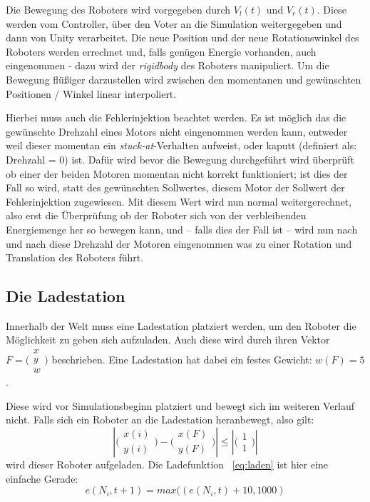 Die Bewegung des Roboters wird vorgegeben durch $V_l(t)$ und $ V_r(t)$. Diese werden vom Controller, {\"{u}}ber den Voter an die Simulation
weitergegeben und dann von Unity verarbeitet. Die neue Position und der neue Rotationswinkel des Roboters werden errechnet und,
falls gen{\"{u}}gen Energie vorhanden, auch eingenommen - dazu wird der \textit{rigidbody} des Roboters manipuliert.
Um die Bewegung fl{\"{u}}{\ss}iger darzustellen wird zwischen den momentanen und gew{\"{u}}nschten Positionen / Winkel linear interpoliert.

Hierbei muss auch die Fehlerinjektion beachtet werden. Es ist m{\"{o}}glich das die gew{\"{u}}nschte Drehzahl eines Motors nicht eingenommen werden
kann, entweder weil dieser momentan ein \textit{stuck-at}-Verhalten aufweist, oder kaputt (definiert als: Drehzahl = 0) ist. Daf{\"{u}}r wird bevor
die Bewegung durchgef{\"{u}}hrt wird {\"{u}}berpr{\"{u}}ft ob einer der beiden Motoren momentan nicht korrekt funktioniert; ist dies der Fall so wird,
statt des gew{\"{u}}nschten Sollwertes, diesem Motor der Sollwert der Fehlerinjektion zugewiesen. Mit diesem Wert wird nun normal weitergerechnet, also
erst die {\"{U}}berpr{\"{u}}fung ob der Roboter sich von der verbleibenden Energiemenge her so bewegen kann, und -- falls dies der Fall ist -- wird nun
nach und nach diese Drehzahl der Motoren eingenommen was zu einer Rotation und Translation des Roboters f{\"{u}}hrt.

\subsection{Die Ladestation}\label{fuelstation}
Innerhalb der Welt muss eine Ladestation platziert werden, um den Roboter die M{\"{o}}glichkeit zu geben sich aufzuladen. Auch diese wird durch ihren Vektor $ F = \bigl(\begin{smallmatrix} x \\ y \\ w \end{smallmatrix}\bigr)$ beschrieben. Eine Ladestation hat dabei ein festes Gewicht: $ w(F) = 5 $.

Diese wird vor Simulationsbeginn platziert und bewegt sich im weiteren Verlauf nicht.
Falls sich ein Roboter an die Ladestation heranbewegt, also gilt: 
\begin{equation}\label{eq:dist}
 |\bigl(\begin{smallmatrix} x(i) \\ y(i) \end{smallmatrix}\bigr) - \bigl(\begin{smallmatrix} x(F) \\ y(F) \end{smallmatrix}\bigr)| \leq |\bigl(\begin{smallmatrix} 1 \\ 1 \end{smallmatrix}\bigr)|
\end{equation}
wird dieser Roboter aufgeladen. Die Ladefunktion ~\ref{eq:laden} ist hier eine einfache Gerade:
\begin{equation}
    \label{eq:laden}
	e(N_i, t + 1) = max((e(N_i, t) + 10, 1000) 
\end{equation}

